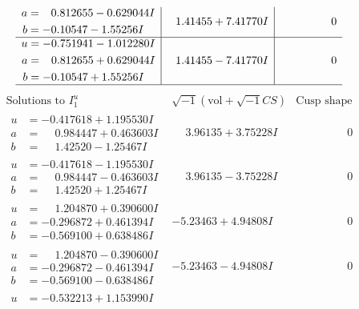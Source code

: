 \documentclass[1p]{elsarticle_modified}
\theoremstyle{definition}
\newcommand{\I}{\sqrt{-1}}
\begin{document}
$$\begin{array}{c|c|c}
\begin{aligned}
a &= \phantom{-}0.812655 - 0.629044 I \\
b &= -0.10547 - 1.55256 I\end{aligned}
 & \phantom{-}1.41455 + 7.41770 I & \phantom{-0.000000 } 0 \\ \hline\begin{aligned}
u &= -0.751941 - 1.012280 I \\
a &= \phantom{-}0.812655 + 0.629044 I \\
b &= -0.10547 + 1.55256 I\end{aligned}
 & \phantom{-}1.41455 - 7.41770 I & \phantom{-0.000000 } 0\\
 \hline 
 \end{array}$$\newpage$$\begin{array}{c|c|c}  
\text{Solutions to }I^u_{1}& \I (\text{vol} + \sqrt{-1}CS) & \text{Cusp shape}\\
 \hline 
\begin{aligned}
u &= -0.417618 + 1.195530 I \\
a &= \phantom{-}0.984447 + 0.463603 I \\
b &= \phantom{-}1.42520 - 1.25467 I\end{aligned}
 & \phantom{-}3.96135 + 3.75228 I & \phantom{-0.000000 } 0 \\ \hline\begin{aligned}
u &= -0.417618 - 1.195530 I \\
a &= \phantom{-}0.984447 - 0.463603 I \\
b &= \phantom{-}1.42520 + 1.25467 I\end{aligned}
 & \phantom{-}3.96135 - 3.75228 I & \phantom{-0.000000 } 0 \\ \hline\begin{aligned}
u &= \phantom{-}1.204870 + 0.390600 I \\
a &= -0.296872 + 0.461394 I \\
b &= -0.569100 + 0.638486 I\end{aligned}
 & -5.23463 + 4.94808 I & \phantom{-0.000000 } 0 \\ \hline\begin{aligned}
u &= \phantom{-}1.204870 - 0.390600 I \\
a &= -0.296872 - 0.461394 I \\
b &= -0.569100 - 0.638486 I\end{aligned}
 & -5.23463 - 4.94808 I & \phantom{-0.000000 } 0 \\ \hline\begin{aligned}
u &= -0.532213 + 1.153990 I \\

\end{aligned}
\end{array}$$
\end{document}
